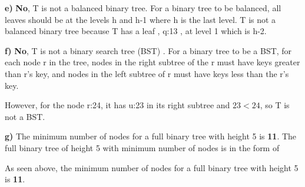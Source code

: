 \documentclass[11pt]{article}
\begin{document}
\newpage
\noindent \textbf{e)} \newline \newline
\textbf{No}, T is not a balanced binary tree. \newline \newline
For a binary tree to be balanced, all leaves should be at the levels h and h-1 where h is the last level. \newline \newline
T is not a balanced binary tree because T has a leaf , q:13 , at level 1 which is h-2.  \newline \newline


\noindent \textbf{f)} \newline \newline
\textbf{No}, T is not a binary search tree (BST) . \newline \newline
For a binary tree to be a BST, for each node r in the tree, nodes in the right subtree of the r must have keys greater 
than r's key, and nodes in the left subtree of r must have keys less than the r's key. \newline

\noindent However, for the node r:24, it has u:23 in its right subtree and $23 < 24$, so T is not a BST. \newline \newline

\noindent \textbf{g)} \newline \newline
The minimum number of nodes for a full binary tree with height 5 is \textbf{11}.\newline
The full binary tree of height 5 with minimum number of nodes is in the form of  \newline

\begin{center}
\end{center}

\noindent As seen above, the minimum number of nodes for a full binary tree with height 5 is \textbf{11}.\newline 
\end{document}
